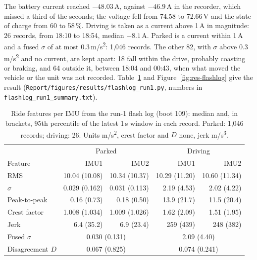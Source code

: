 The battery current reached $-48.03$\,A, against $-46.9$\,A in the recorder, which missed a third of the seconds; the voltage fell from 74.58 to 72.66\,V and the state of charge from 60 to 58\,\%. Driving is taken as a current above 1\,A in magnitude: 26 records, from 18:10 to 18:54, median $-8.1$\,A. Parked is a current within 1\,A and a fused $\sigma$ of at most 0.3\,m/s\textsuperscript{2}: 1,046 records. The other 82, with $\sigma$ above 0.3\,m/s\textsuperscript{2} and no current, are kept apart: 18 fall within the drive, probably coasting or braking, and 64 outside it, between 18:04 and 00:43, when what moved the vehicle or the unit was not recorded. Table~\ref{tab:res-flashlog} and Figure~\ref{fig:res-flashlog} give the result (\texttt{Report/\allowbreak{}figures/\allowbreak{}results/\allowbreak{}flashlog\_\allowbreak{}run1.py}, numbers in \texttt{flashlog\_\allowbreak{}run1\_\allowbreak{}summary.txt}).

\begin{table}[htbp]
\centering
\small
\caption[Ride features per IMU from the run-1 flash log (boot 109): median and, in brackets, 95th percentile of the latest 1\,s window in each record]{Ride features per IMU from the run-1 flash log (boot 109): median and, in brackets, 95th percentile of the latest 1\,s window in each record. Parked: 1,046 records; driving: 26. Units m/s\textsuperscript{2}, crest factor and $D$ none, jerk m/s\textsuperscript{3}.}
\label{tab:res-flashlog}
\begin{tabular}{lrrrr}
\hline
 & \multicolumn{2}{c}{Parked} & \multicolumn{2}{c}{Driving} \\
Feature & IMU1 & IMU2 & IMU1 & IMU2 \\
\hline
RMS & 10.04 (10.08) & 10.34 (10.37) & 10.29 (11.20) & 10.60 (11.34) \\
$\sigma$ & 0.029 (0.162) & 0.031 (0.113) & 2.19 (4.53) & 2.02 (4.22) \\
Peak-to-peak & 0.16 (0.73) & 0.18 (0.50) & 13.9 (21.7) & 11.5 (20.4) \\
Crest factor & 1.008 (1.034) & 1.009 (1.026) & 1.62 (2.09) & 1.51 (1.95) \\
Jerk & 6.4 (35.2) & 6.9 (23.4) & 259 (439) & 248 (382) \\
Fused $\sigma$ & \multicolumn{2}{c}{0.030 (0.131)} & \multicolumn{2}{c}{2.09 (4.40)} \\
Disagreement $D$ & \multicolumn{2}{c}{0.067 (0.825)} & \multicolumn{2}{c}{0.074 (0.241)} \\
\hline
\end{tabular}
\end{table}

